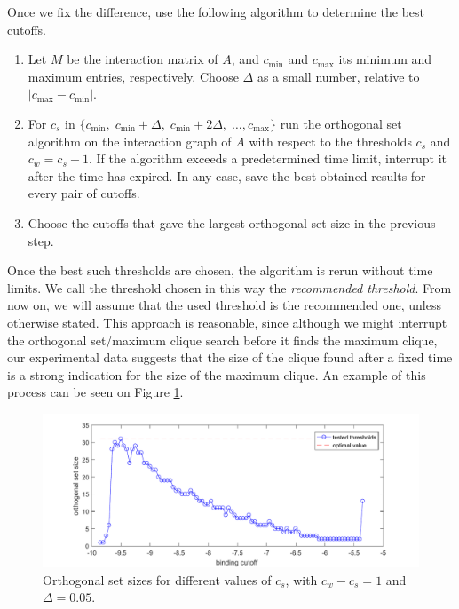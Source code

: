 \documentclass[12pt,a4paper,titlepage,openany]{report}
\begin{document}
Once we fix the difference, use the following algorithm to determine the best cutoffs.
\begin{enumerate}
	\item Let $M$ be the interaction matrix of $A$, and $c_\mathrm{min}$ and $c_\mathrm{max}$ its minimum and maximum entries, respectively. Choose $\Delta$ as a small number, relative to $|c_\mathrm{max} - c_\mathrm{min}|$.
	\item For $c_s$ in $\{ c_\mathrm{min},\; c_\mathrm{min} + \Delta,\; c_\mathrm{min} + 2\Delta,\; \dots, c_\mathrm{max} \}$ run the orthogonal set algorithm on the interaction graph of $A$ with respect to the thresholds $c_s$ and $c_w = c_s + 1$. If the algorithm exceeds a predetermined time limit, interrupt it after the time has expired. In any case, save the best obtained results for every pair of cutoffs.
	\item Choose the cutoffs that gave the largest orthogonal set size in the previous step.
\end{enumerate}

Once the best such thresholds are chosen, the algorithm is rerun without time limits. We call the threshold chosen in this way the \emph{recommended threshold}. From now on, we will assume that the used threshold is the recommended one, unless otherwise stated. This approach is reasonable, since although we might interrupt the orthogonal set/maximum clique search before it finds the maximum clique, our experimental data suggests that the size of the clique found after a fixed time is a strong indication for the size of the maximum clique. An example of this process can be seen on Figure \ref{fig:Cutoff bruteforce}.

\begin{figure}[h]
	\centering
	\includegraphics[width=\linewidth]{cutoff_bruteforce.pdf}
	\caption{Orthogonal set sizes for different values of $c_s$, with $c_w-c_s = 1$ and $\Delta = 0.05$.}
	\label{fig:Cutoff bruteforce}
\end{figure}
\end{document}
